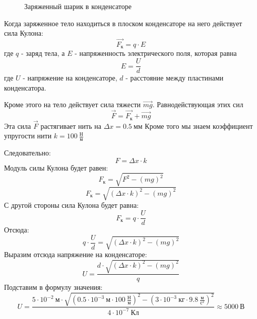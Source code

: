\documentclass{article}
\begin{document}
    \begin{figure}
        \centering
        \caption{Заряженный шарик в конденсаторе}
    \end{figure}

    Когда заряженное тело находиться в плоском конденсаторе на него действует сила Кулона:
    \[
        \vec{F_{\text{к}}} = q \cdot E
    \]
    где $q$ - заряд тела, а $E$ - напряженность электрического поля, которая равна 
    \[
        E = \frac{U}{d}
    \]
    где $U$ - напряжение на конденсаторе, $d$ - расстояние между пластинами конденсатора.

    Кроме этого на тело действует сила тяжести $\vec{mg}$. Равнодействующая этих сил 
    \[
        \vec{F} = \vec{F_{\text{к}}} + \vec{mg}
    \]
    Эта сила $\vec{F}$ растягивает нить на $\Delta x = 0.5\ \text{мм}$ Кроме того мы знаем коэффициент упругости нити $k = 100\ \frac{\text{Н}}{\text{м}}$

    Следовательно:
    \[
        F = \Delta x \cdot k
    \]
    Модуль силы Кулона будет равен:
    \[
        F_{\text{к}} = \sqrt{F^2 - (mg)^2}
    \]
    \[
        F_{\text{к}} = \sqrt{(\Delta x \cdot k)^2 - (mg)^2}
    \]
    С другой стороны сила Кулона будет равна:
    \[
        F_{\text{к}} = q \cdot \frac{U}{d}
    \]
    Отсюда:
    \[
        q \cdot \frac{U}{d} = \sqrt{(\Delta x \cdot k)^2 - (mg)^2}
    \]
    Выразим отсюда напряжение на конденсаторе:
    \[
        U = \frac{d \cdot \sqrt{(\Delta x \cdot k)^2 - (mg)^2}}{q}
    \]
    Подставим в формулу значения:
    \[
        U = \frac{5 \cdot 10^{-2}\ \text{м} \cdot \sqrt{(0.5 \cdot 10^{-3}\ \text{м} \cdot 100\ \frac{\text{Н}}{\text{м}})^2 - (3 \cdot 10^{-3}\ \text{кг} \cdot 9.8\ \frac{\text{м}}{\text{с}^2})^2}}{4 \cdot 10^{-7}\ \text{Кл}} \approx 5000 \ \text{В}
    \]
\end{document}
